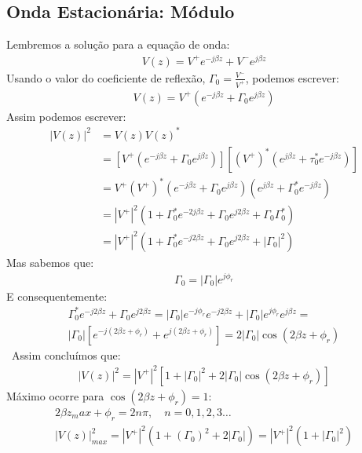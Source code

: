 \documentclass[11pt,a4paper]{article}
\begin{document}
\subsection{Onda Estacionária: Módulo}
Lembremos a solução para a equação de onda:
\begin{align*}
V(z)= V^+ e^{-j \beta z} + V^- e^{j\beta z}
\end{align*}
Usando o valor do coeficiente de reflexão, $\Gamma_0= \frac{V^-}{V^+}$, podemos escrever:
\begin{align*}
  V(z)= V^+ (e^{-j \beta z}+ \Gamma_0 e^{j\beta z})
\end{align*}
Assim podemos escrever:
\begin{align*}
|V(z)|^2 &= V(z)V(z)^*\\
&= \left[ V^+ \left( e^{-j\beta z} + \Gamma_0 e^{j\beta z} \right) \right] \left[ \left( V^+ \right)^* \left( e^{j\beta z} + \tau^*_0 e^{-j \beta z} \right) \right]\\
&= V^+ \left( V^+ \right)^* \left( e^{- j \beta z} + \Gamma_0 e^{j \beta z} \right) \left( e^{j \beta z } + \Gamma^*_0 e^{-j\beta z} \right) \\
&= \left| V^+ \right|^2 \left( 1+ \Gamma_0^* e^{-2j\beta z} + \Gamma_0 e^{j 2 \beta z} + \Gamma_0 \Gamma_0^* \right) \\
&= \left| V^+ \right|^2 \left( 1+ \Gamma_0^* e^{-j2\beta z} + \Gamma_0 e^{j2\beta z} + \left| \Gamma_0 \right|^2 \right)
\end{align*}
Mas sabemos que:
\begin{align*}
  \Gamma_0 = \left| \Gamma_0 \right|e^{j \phi_r}
\end{align*}
E consequentemente:
\begin{align*}
  \Gamma_0^* e^{-j2\beta z} + \Gamma_0 e^{j 2 \beta z} = \left| \Gamma_0 \right| e^{- j \phi_r}e^{-j2\beta z} + \left| \Gamma_0 \right|e^{j \phi_r}e^{j\beta z}=\\  \left| \Gamma_0 \right| \left[ e^{-j \left( 2 \beta z + \phi_r \right)} + e^{j \left( 2\beta z + \phi_r \right)} \right] = 2 \left| \Gamma_0 \right| \cos \left( 2 \beta z + \phi_r \right) 
\end{align*}\
Assim concluímos que:
\begin{align*}
  \left| V(z) \right|^2 = \left| V^+ \right|^2 \left[ 1 + \left| \Gamma_0 \right|^2 + 2 \left| \Gamma_0 \right|\cos \left( 2\beta z + \phi_r \right) \right]
\end{align*}
Máximo ocorre para $\cos(2 \beta z + \phi_r)=1$:
\begin{align*}
  2 \beta z_max + \phi_r = 2 n \pi , \quad n=0,1,2,3 \ldots \\
  \left| V(z) \right|^2_{max} = \left| V^+ \right|^2 \left( 1 + \left( \Gamma_0 \right)^2 + 2 \left| \Gamma_0 \right| \right)= \left| V^+ \right|^2 \left( 1 + \left| \Gamma_0 \right|^2 \right)
\end{align*}
\end{document}
